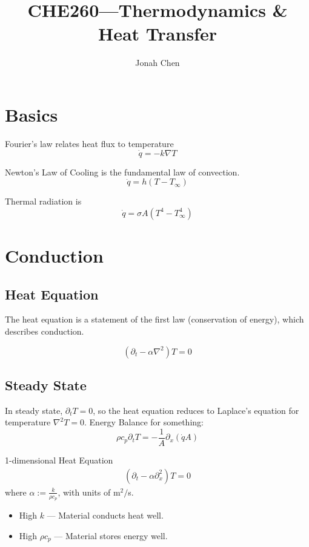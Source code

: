\documentclass[a4paper]{article}
\title{CHE260---Thermodynamics \& Heat Transfer}
\author{Jonah Chen}
\numberwithin{equation}{section}
\begin{document}
    \maketitle
    \tableofcontents
	\section{Basics}
	Fourier's law relates heat flux to temperature
	\begin{equation}
		\dot q=-k\nabla T
	\end{equation}

	Newton's Law of Cooling is the fundamental law of convection.
	\begin{equation}
		\dot q=h(T-T_\infty)
	\end{equation}

	Thermal radiation is
	\begin{equation}
		\dot q=\sigma A(T^4-T_\infty^4)
	\end{equation}

    \section{Conduction}
	\subsection{Heat Equation}
	The heat equation is a statement of the first law (conservation of energy), which describes conduction.

	\begin{equation}
		(\partial_t-\alpha\nabla^2)T=0
	\end{equation}
	
	\subsection{Steady State}
	In steady state, $\partial_t T=0$, so the heat equation reduces to Laplace's equation for temperature $\nabla^2 T=0$.
	Energy Balance for something:	
	\begin{equation}
		\rho c_p\partial_t T=-\frac{1}{A}\partial_x(\dot qA)
	\end{equation}

	1-dimensional Heat Equation	
	\begin{align}
		(\partial_t-\alpha\partial_x^2)T=0
	\end{align}
	where $\alpha:=\frac{k}{\rho c_p}$, with units of m$^2/$s.
	\begin{itemize}
		\item High $k$ --- Material conducts heat well.
		\item High $\rho c_p$ --- Material stores energy well.
	\end{itemize}
\end{document}
